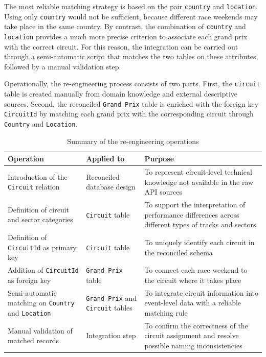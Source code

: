 \documentclass[12pt,a4paper]{article}
\begin{document}
	The most reliable matching strategy is based on the pair \texttt{country} and \texttt{location}.
	Using only \texttt{country} would not be sufficient, because different race weekends may take place in the same country.
	By contrast, the combination of \texttt{country} and \texttt{location} provides a much more precise criterion to associate each grand prix with the correct circuit.
	For this reason, the integration can be carried out through a semi-automatic script that matches the two tables on these attributes, followed by a manual validation step.
	
	Operationally, the re-engineering process consists of two parts.
	First, the \texttt{circuit} table is created manually from domain knowledge and external descriptive sources.
	Second, the reconciled \texttt{Grand Prix} table is enriched with the foreign key \texttt{CircuitId} by matching each grand prix with the corresponding circuit through \texttt{Country} and \texttt{Location}.
	
	\begin{table}[H]
		\centering
		\caption{Summary of the re-engineering operations}
		\renewcommand{\arraystretch}{1.2}
		\begin{tabularx}{\textwidth}{>{\raggedright\arraybackslash}p{4.2cm} >{\raggedright\arraybackslash}p{3.0cm} >{\raggedright\arraybackslash}X}
			\toprule
			\textbf{Operation} & \textbf{Applied to} & \textbf{Purpose} \\
			\midrule
			Introduction of the \texttt{Circuit} relation & Reconciled database design & To represent circuit-level technical knowledge not available in the raw API sources \\
			\addlinespace
			Definition of circuit and sector categories & \texttt{Circuit} table & To support the interpretation of performance differences across different types of tracks and sectors \\
			\addlinespace
			Definition of \texttt{CircuitId} as primary key & \texttt{Circuit} table & To uniquely identify each circuit in the reconciled schema \\
			\addlinespace
			Addition of \texttt{CircuitId} as foreign key & \texttt{Grand Prix} table & To connect each race weekend to the circuit where it takes place \\
			\addlinespace
			Semi-automatic matching on \texttt{Country} and \texttt{Location} & \texttt{Grand Prix} and \texttt{Circuit} tables & To integrate circuit information into event-level data with a reliable matching rule \\
			\addlinespace
			Manual validation of matched records & Integration step & To confirm the correctness of the circuit assignment and resolve possible naming inconsistencies \\
			\bottomrule
		\end{tabularx}
	\end{table}
	
\end{document}
